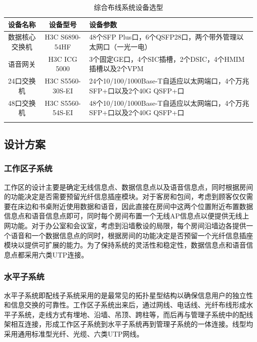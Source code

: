 \documentclass{gdutart}
\begin{document}
    \begin{table}[htpb]
      \begin{center}
        \caption{综合布线系统设备选型}\label{tab:tab15}
        \begin{tabularx}{\linewidth}{c|c|Y}
          \Xhline{1.5pt}
          设备名称 & 设备型号 & 设备参数 \\
          \hline
          数据核心交换机 & H3C S6890-54HF & 48个SFP Plus口，6个QSFP28口，两个带外管理以太网口（一光一电） \\
          \hline
          语音网关 & H3C ICG 5000 & 3个固定GE口，4个SIC插槽，2个DSIC，4个HMIM插槽以及2个VPM \\
          \hline
          24口交换机 & H3C S5560-30S-EI & 24个10/100/1000Base-T自适应以太网端口，4个万兆SFP+口以及2个40G QSFP+口 \\
          \hline
          48口交换机 & H3C S5560-54S-EI & 48个10/100/1000Base-T自适应以太网端口，4个万兆SFP+口以及2个40G QSFP+口 \\
          \Xhline{1.5pt}
        \end{tabularx}
      \end{center}
    \end{table}

    \subsection{设计方案}
      \subsubsection{工作区子系统}
      工作区的设计主要是确定无线信息点、数据信息点以及语音信息点，同时根据房间的功能决定是否需要预留光纤信息插座模块。对于客房和包间，考虑到顾客仅仅需要在床边和书桌附近使用数据和语音，因此直接在房间中这两个位置附近布置数据信息点和语音信息点即可，同时每个房间布置一个无线AP信息点以便提供无线上网功能。对于办公室和会议室，考虑到沿墙敷设的局限，每个房间沿墙边各提供一个语音和一个数据信息点的同时，根据房间的功能决定是否预留一个光纤信息插座模块以提供可扩展的能力。为了保持系统的灵活性和稳定性，数据信息点和语音信息点都采用六类UTP连接。

      \subsubsection{水平子系统}
      水平子系统即配线子系统采用的是最常见的拓扑星型结构以确保信息用户的独立性和信息交换的可靠性。工作区子系统出来后，通过网线、电话线、光纤布线形成水平子系统，走线方式有埋地、沿墙、吊顶、跨柱等，而后再与管理子系统中的配线架相互连接，形成工作区子系统到水平子系统再到管理子系统的一体连接。线型均采用通用标准型光纤、光缆、六类UTP网线。
\end{document}
